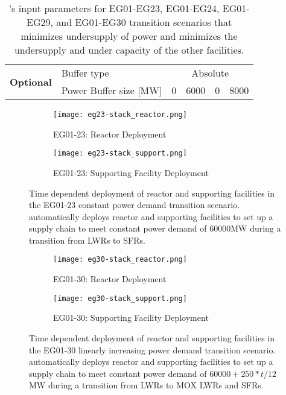 \begin{table}[]
{\begin{tabular}{|l|l|c|l|l|l|}
    \multirow{2}{*}{\textbf{Optional}} & Buffer type                                                    & \multicolumn{4}{c|}{Absolute}                                                                                                                                                                                                                                                               \\ \cline{2-6} 
                                              & Power Buffer size [MW]                                                   & 0 & 6000 & 0 & 8000 \\ \hline
    \end{tabular}%
    }
	\caption{\deploy's input parameters for EG01-EG23, EG01-EG24, EG01-EG29, and 
	EG01-EG30 transition scenarios
	that minimizes undersupply of power and minimizes 
	the undersupply and under capacity of the other facilities. }
    \label{tab:bestinputs}
    \end{table}

\begin{figure}[]
	\centering
	\begin{subfigure}[t]{1.2\textwidth}
		\centering
		\texttt{[image: eg23-stack\_reactor.png]} 
		\caption{EG01-23: Reactor Deployment}
		\label{fig:23reactor}
	\end{subfigure}
	\vspace{1cm}
	\begin{subfigure}[t]{1.2\textwidth}
		\centering
		\texttt{[image: eg23-stack\_support.png]} 
		\caption{EG01-23: Supporting Facility Deployment}
		\label{fig:23support}
	\end{subfigure}
	\hfill
	\caption{Time dependent deployment of reactor and supporting facilities in 
	the EG01-23 constant power demand transition scenario. 
	\deploy automatically deploys reactor and supporting facilities 
	to set up a supply chain to meet constant power demand of 60000MW 
	during a transition from \glspl{LWR} to \glspl{SFR}. }
	\label{fig:23stack}
\end{figure}

\begin{figure}[]
	\centering
	\begin{subfigure}[t]{1.2\textwidth}
		\centering
		\texttt{[image: eg30-stack\_reactor.png]} 
		\caption{EG01-30: Reactor Deployment}
		\label{fig:30reactor}
	\end{subfigure}
	\vspace{1cm}
	\begin{subfigure}[t]{1.2\textwidth}
		\centering
		\texttt{[image: eg30-stack\_support.png]} 
		\caption{EG01-30: Supporting Facility Deployment}
		\label{fig:30support}
	\end{subfigure}
	\hfill
	\caption{Time dependent deployment of reactor and supporting facilities in 
	the EG01-30 linearly increasing power demand transition scenario. 
	\deploy automatically deploys reactor and supporting facilities 
	to set up a supply chain to meet constant power demand of $60000 + 250*t/12$ MW
	during a transition from \glspl{LWR} to MOX LWRs and \glspl{SFR}. }
	\label{fig:30stack}
\end{figure}
